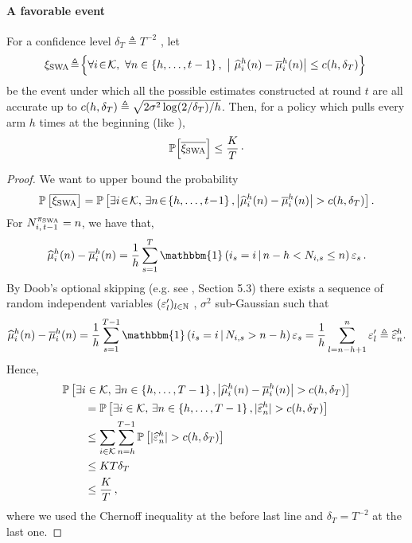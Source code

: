 \paragraph{A favorable event}
\begin{proposition}
\label{prop:prb_favorable_event_SWA}
For a confidence level $\delta_{T} \triangleq T^{-2}$
, let
\begin{equation}
\!\xi_{\rm SWA} \! \triangleq\! \Big\{\forall i\!\in\!\mathcal{K},\ \forall n\in \left\{h, \dots, t-1\right\}, \ \big| \ \widehat{\mu}_i^h(n) - \overline{\mu}_i^h(n) \big| \leq c(h, \delta_{T}) \Big\}
\label{eq:def_favorable_event_SWA}
\end{equation}
be the event under which all the possible estimates constructed at round $t$ are all accurate up to $c(h,\delta_{T}) \triangleq \sqrt{2 \sigma^2\log(2/\delta_T)/h}$. Then, for a policy which pulls every arm $h$ times at the beginning (like \SWA),
\[
\mathbb{P}\Big[\overline{\xi_{\rm SWA}}\Big] \leq\frac{K}{T}\,\cdot
\]
\end{proposition} 
%
\begin{proof}
We want to upper bound the probability
\[
\PP{\bar{\HPSWA}} = \PP{\exists i \!\in\! \arms,\,\exists n \!\in\! \left\{h, \dots, t\!-\!1\right\}, \big| \hmu_i^h(n) - \bmu_i^h(n)\big|>c(h,\delta_T) }.
\]
%
For $N_{i,\,t-1}^{\pi_{\rm SWA}} = n$, we have that, 
\[
 \hmu_i^h(n) - \bmu_i^h(n)= \frac{1}{h} \sum_{s=1}^{T}\mathbbm{1}\pa{i_s = i \, |\, n -h < N_{i,s} \leq  n}\epsilon_s\,.
\]
By Doob's optional skipping (e.g. see \citet{chow1997probability}, Section 5.3) there exists a sequence of random independent variables $(\varepsilon'_l)_{l\in{\mathbb N}}$ , $\sigma^2$ sub-Gaussian such that 
\[\hmu_i^h(n) - \bmu_i^h(n)= \frac{1}{h} \sum_{s=1}^{T-1}\mathbbm{1}\pa{i_s = i \, |\, N_{i,s}> n - h }\epsilon_s=  \frac{1}{h} \sum_{l=n-h+1}^n \epsilon'_l \triangleq \hepsilon^h_n. \]
%
Hence, 
\begin{align*}
    &\PP{\exists i \in \arms,\,\exists n \in \left\{h, \dots, T-1\right\}, \big| \hmu_i^h(n) - \bmu_i^h(n)\big|>c(h,\delta_T) }\\
    &\qquad= \PP{\exists i \in \arms,\,\exists n \in \left\{h, \dots, T-1\right\},|\hepsilon^h_n|>c(h,\delta_T) }\\
    &\qquad\leq \sum_{i \in \arms} \sum_{n=h}^{T-1} \PP{|\hepsilon^h_n|>c(h,\delta_T)} \\
    &\qquad\leq  KT \delta_T  \\
    &\qquad \leq \frac{K}{T}\,,
\end{align*}
where we used the Chernoff inequality at the before last line and $\delta_{T} = T^{-2}$ at the last one. 
\end{proof}
%
